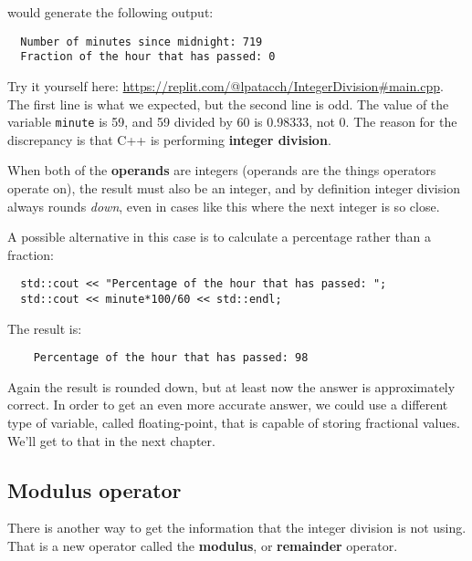 would generate the following output:

\begin{verbatim}
  Number of minutes since midnight: 719
  Fraction of the hour that has passed: 0
\end{verbatim}
%
Try it yourself here: \url{https://replit.com/@lpatacch/IntegerDivision#main.cpp}.
The first line is what we expected, but the second line is
odd.  The value of the variable {\tt minute} is 59, and
59 divided by 60 is 0.98333, not 0.  The reason for the
discrepancy is that C++ is performing {\bf integer division}.


When both of the {\bf operands} are integers (operands are the things
operators operate on), the result must also be an integer,
and by definition integer division always rounds {\em down},
even in cases like this where the next integer is so close.

A possible alternative in this case is to calculate a percentage
rather than a fraction:

\begin{mdframed}
\begin{verbatim} 
  std::cout << "Percentage of the hour that has passed: ";
  std::cout << minute*100/60 << std::endl;
\end{verbatim}
\end{mdframed}

%
The result is:

\begin{verbatim}
    Percentage of the hour that has passed: 98
\end{verbatim}
%
Again the result is rounded down, but at least now the answer
is approximately correct.  In order to get an even more accurate
answer, we could use a different type of variable, called
floating-point, that is capable of storing fractional values.
We'll get to that in the next chapter.

\subsection{Modulus operator}
\label{modulus}
There is another way to get the information that the integer division is not using. That is a new operator called the {\bf modulus}, or {\bf remainder} operator.

